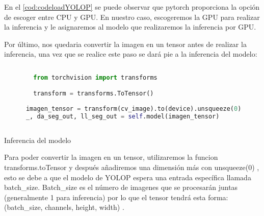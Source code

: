     En el \ref{cod:codeloadYOLOP} se puede observar que pytorch proporciona la opción de escoger entre CPU y GPU. En nuestro caso, escogeremos
    la GPU para realizar la inferencia y le asignaremos al modelo que realizaremos la inferencia por GPU. \newline

    Por último, nos quedaria convertir la imagen en un tensor antes de realizar la inferencia, una vez que se realice este paso
    se dará pie a la inferencia del modelo: 

    \begin{code}[h]
      \begin{lstlisting}[language=Python]
     
        from torchvision import transforms

        transform = transforms.ToTensor() 
                    
      imagen_tensor = transform(cv_image).to(device).unsqueeze(0)
      _, da_seg_out, ll_seg_out = self.model(imagen_tensor)
    
      \end{lstlisting}
      \caption[Inferencia del modelo]{Inferencia del modelo}
      \label{cod:codejemplo}
      \end{code}  

    Para poder convertir la imagen en un tensor, utilizaremos la funcion transforms.toTensor y después añadiremos una dimensión más con unsqueeze(0) , esto se debe 
    a que el modelo de YOLOP espera una entrada específica llamada batch\_size. Batch\_size es el número de imagenes que se procesarán juntas
    (generalmente 1 para inferencia) por lo que el tensor tendrá esta forma: (batch\_size, channels, height, width) \break. 

